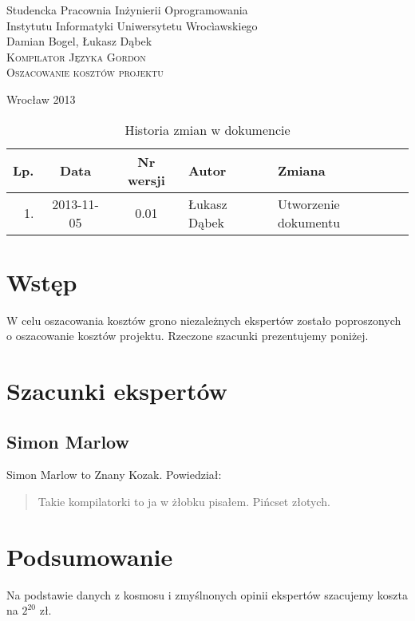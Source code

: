 \documentclass{documentation}
\begin{document}
\begin{titlepage}
\begin{center}
Studencka Pracownia Inżynierii Oprogramowania\\
Instytutu Informatyki Uniwersytetu Wrocìawskiego\\[6cm]

Damian Bogel, Łukasz Dąbek\\[1cm]
\textsc{\LARGE Kompilator Języka Gordon}\\[0.5cm]
\textsc{\large Oszacowanie kosztów projektu}

\vfill
Wrocław 2013 \\[2.5cm]

\end{center}
\end{titlepage}

\newpage
\begin{table}
	\centering
	\caption{Historia zmian w dokumencie}
		\begin{tabular}{|r|c|c|l|l|}
		\hline
		Lp.  & Data       & Nr wersji & Autor                 & Zmiana \\ \hline
		1.   & 2013-11-05 & 0.01 & Łukasz Dąbek & Utworzenie dokumentu \\ \hline
	\end{tabular}
\end{table}
\newpage

\tableofcontents
\setcounter{page}{2}

\newpage

\section{Wstęp}
\noindent W celu oszacowania kosztów grono niezależnych ekspertów zostało poproszonych
o oszacowanie kosztów projektu. Rzeczone szacunki prezentujemy poniżej.

\section{Szacunki ekspertów}
\subsection{Simon Marlow}
Simon Marlow to Znany Kozak. Powiedział:
\begin{quotation}
    Takie kompilatorki to ja w żłobku pisałem. Pińcset złotych.
\end{quotation}

\section{Podsumowanie}
Na podstawie danych z kosmosu i zmyślnonych opinii ekspertów szacujemy koszta na
$2^{20}$ zł.
\end{document}
